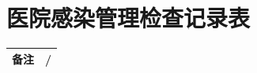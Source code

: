 \documentclass[UTF8,10pt,a4paper,fontset=fandol]{ctexart}
\newcommand{\fieldvalue}[1]{#1}
\newcommand{\handwritten}[1]{#1}
\begin{document}

\newpage

\section*{医院感染管理检查记录表}

\begin{tabularx}{\textwidth}{|p{}|X|}
\hline
备注 &
\fieldvalue{\handwritten{/}} \\ \hline
\end{tabularx}

\vspace{0.5em}
\end{document}
